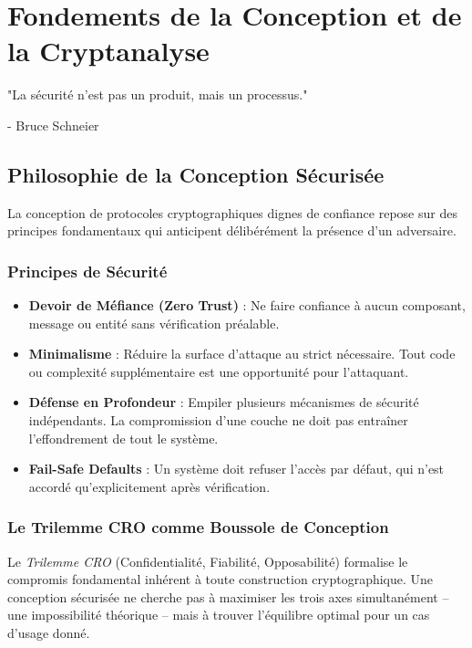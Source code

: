 \chapter{Fondements de la Conception et de la Cryptanalyse}
\label{chap:17}

\epigraph{"La sécurité n'est pas un produit, mais un processus."}{- Bruce Schneier}

\section{Philosophie de la Conception Sécurisée}
\label{sec:17.1}

La conception de protocoles cryptographiques dignes de confiance repose sur des principes fondamentaux qui anticipent délibérément la présence d'un adversaire.

\subsection{Principes de Sécurité}
\label{subsec:17.1.1}

\begin{itemize}
    \item \textbf{Devoir de Méfiance (Zero Trust)} : Ne faire confiance à aucun composant, message ou entité sans vérification préalable.
    \item \textbf{Minimalisme} : Réduire la surface d'attaque au strict nécessaire. Tout code ou complexité supplémentaire est une opportunité pour l'attaquant.
    \item \textbf{Défense en Profondeur} : Empiler plusieurs mécanismes de sécurité indépendants. La compromission d'une couche ne doit pas entraîner l'effondrement de tout le système.
    \item \textbf{Fail-Safe Defaults} : Un système doit refuser l'accès par défaut, qui n'est accordé qu'explicitement après vérification.
\end{itemize}

\subsection{Le Trilemme CRO comme Boussole de Conception}
\label{subsec:17.1.2}

Le \textit{Trilemme CRO} (Confidentialité, Fiabilité, Opposabilité) formalise le compromis fondamental inhérent à toute construction cryptographique. Une conception sécurisée ne cherche pas à maximiser les trois axes simultanément – une impossibilité théorique – mais à trouver l'équilibre optimal pour un cas d'usage donné.

